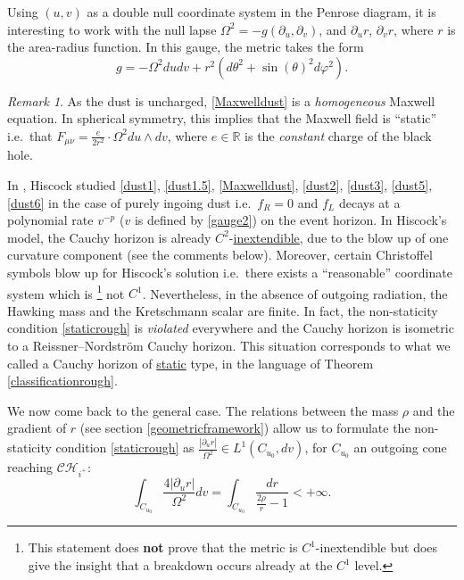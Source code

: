 \documentclass[10pt,a4paper]{article}
\theoremstyle{plain}
\theoremstyle{remark}
\newtheorem{rmk}{Remark}[section]
\theoremstyle{definition}
\newcommand{\RR}{\mathbb{R}}
\theoremstyle{plain}
\theoremstyle{remark}
\theoremstyle{definition}
\newcommand{\CH}{\mathcal{CH}_{i^+}}
\numberwithin{equation}{section}
\begin{document}
Using $(u,v)$ as a double null coordinate system in the Penrose diagram, it is interesting to work with the null lapse $\Omega^2=-g(\partial_u, \partial_v)$, and $\partial_u r$, $\partial_v r$, where $r$ is the area-radius function. In this gauge, the metric takes the form $$ g=-\Omega^2 du dv+r^2 (d\theta^2+\sin(\theta)^2 d\varphi^2).$$   \begin{rmk} \label{staticMaxwell}
	As the dust is uncharged, \eqref{Maxwelldust} is a \textit{homogeneous} Maxwell equation. In spherical symmetry, this implies that the Maxwell field is ``static'' i.e.\ that $F_{\mu \nu}=  \frac{e}{2r^2}  \cdot \Omega^2 du \wedge dv $, where $e \in \RR$ is the \textit{constant} charge of the black hole.
\end{rmk} 
In \cite{Hiscock}, Hiscock studied  \eqref{dust1}, \eqref{dust1.5}, \eqref{Maxwelldust}, \eqref{dust2}, \eqref{dust3}, \eqref{dust5}, \eqref{dust6} in the case of purely ingoing  dust i.e.\ $f_R=0$ and $f_L$ decays at a polynomial rate $v^{-p}$ ($v$ is defined by \eqref{gauge2}) on the event horizon. In Hiscock's model, \color{black}  the Cauchy horizon is already $C^2$-\underline{inextendible}, due to the blow up of one curvature component (see the comments below).  Moreover, certain Christoffel symbols blow up for Hiscock's solution i.e.\ there exists a ``reasonable'' coordinate system which is \footnote{This statement does \textbf{not} prove that the metric is $C^1$-inextendible but does give the insight that a breakdown occurs already at the $C^1$ level.} not $C^1$. Nevertheless, in the absence of outgoing \color{black} radiation, the Hawking mass and the Kretschmann scalar are finite. In fact,  the non-staticity condition \eqref{staticrough} is \textit{violated} everywhere and the Cauchy horizon is isometric to a Reissner--Nordstr\"{o}m Cauchy horizon. This situation corresponds to what we called a Cauchy horizon of \underline{static} type, in the language of Theorem \ref{classificationrough}.\color{black}



We now come back to the general case. \color{black} The relations between the mass $\rho$ and the gradient of $r$ (see section \ref{geometricframework}) allow us to formulate the non-staticity condition \eqref{staticrough} as  $\frac{|\partial_u r|}{\Omega^2} \in L^1(C_{u_0},dv)$, for $C_{u_0}$ an outgoing cone reaching $\CH$: \begin{equation} \label{staticityrough2}
\int_{C_{u_0}} \frac{4|\partial_u r|}{\Omega^2} dv =	\int_{C_{u_0}} \frac{dr}{ \frac{2\rho}{r}-1} <+\infty.
\end{equation} 	 		
\end{document}
